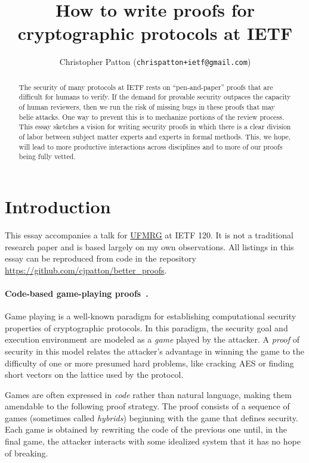 \documentclass{article}
\title{How to write proofs for cryptographic protocols at IETF}
\author{Christopher Patton ({\texttt{\small chrispatton+ietf@gmail.com}})}
\begin{document}
\maketitle

\begin{abstract}

  The security of many protocols at IETF rests on ``pen-and-paper'' proofs that
  are difficult for humans to verify.
  If the demand for provable security outpaces the capacity of human reviewers,
  then we run the risk of missing bugs in these proofs that may belie attacks.
  One way to prevent this is to mechanize portions of the review process.
  This essay sketches a vision for writing security proofs in which there is a
  clear division of labor between subject matter experts and experts in formal
  methods.
  This, we hope, will lead to more productive interactions across disciplines
  and to more of our proofs being fully vetted.

\end{abstract}

\section{Introduction}

This essay accompanies a talk for
\href{https://datatracker.ietf.org/group/ufmrg/about/}{UFMRG} at IETF 120.
%
It is not a traditional research paper and is based largely on my own
observations.
%
All listings in this essay can be reproduced from code in the repository
\url{https://github.com/cjpatton/better_proofs}.


\paragraph{Code-based game-playing proofs~\cite{BR06}.}
%
Game playing is a well-known paradigm for establishing computational security
properties of cryptographic protocols.
%
In this paradigm, the security goal and execution environment are modeled as a
\emph{game} played by the attacker. A \emph{proof} of security in this model
relates the attacker's advantage in winning the game to the difficulty of one
or more presumed hard problems, like cracking AES or finding short vectors on
the lattice used by the protocol.

Games are often expressed in \emph{code} rather than natural language, making
them amendable to the following proof strategy.
%
The proof consists of a sequence of games (sometimes called \emph{hybrids})
beginning with the game that defines security.
%
Each game is obtained by rewriting the code of the previous one until, in the
final game, the attacker interacts with some idealized system that it has no
hope of breaking.
\end{document}
